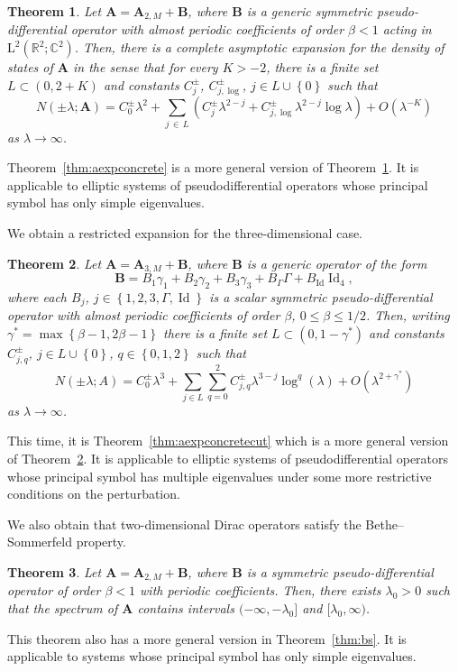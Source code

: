 \documentclass[10pt]{amsart}
\newtheorem{theo}{Theorem}[section]
\theoremstyle{definition}\newtheorem{defi}[theo]{Definition}\newtheorem{rema}[theo]{Remark}\newtheorem{exam}[theo]{Example}\newtheorem{nota}[theo]{Notation}
\DeclareMathOperator{\Id}{Id}
\newcommand{\RL}{\mathrm{L}}
\newcommand{\R}{\mathbb R}
\newcommand{\C}{\mathbb C}
\newcommand{\BA}{\mathbf A}
\newcommand{\BB}{\mathbf B}
\newcommand{\bigo}[1]{O\left(#1 \right)}
\newcommand{\set}[1]{\left\{ #1 \right\}}
\begin{document}
\begin{theo}\label{thm:dirac2dids}
Let $\BA = \BA_{2,M} + \BB$, where $\BB$ is a generic symmetric pseudo-differential operator with almost periodic coefficients of order $\beta < 1$ acting in $\RL^2(\R^2;\C^2)$. Then, there is a complete asymptotic expansion for the density of states of $\BA$ in the sense that for every $K > -2$, there is a finite set $L \subset (0,2+K)$ and constants $C_{j}^\pm$, $C_{j,\log}^\pm$, $j \in L \cup \set 0$ such that
\begin{equation}
N(\pm\lambda;\BA) = C_0^\pm \lambda^2 + \sum_{j\,\in\,L}\left(C_{j}^\pm
\lambda^{2 - j} + C_{j,\log}^\pm \lambda^{2-j} \log \lambda \right)+ \bigo{\lambda^{-K}}
\end{equation}
as $\lambda \to \infty$.
\end{theo}
Theorem~\ref{thm:aexpconcrete} is a more general version of Theorem~\ref{thm:dirac2dids}. It is applicable to elliptic systems of pseudodifferential operators whose principal symbol has only simple eigenvalues.

We obtain a restricted expansion for the three-dimensional case.
\begin{theo}\label{thm:dirac3dids}
Let $\BA = \BA_{3,M} + \BB$, where $\BB$ is a generic operator of the form
\[
\BB = B_1 \gamma_1 + B_2 \gamma_2 + B_3 \gamma_3 + B_\Gamma \Gamma + B_{\Id}
\Id_4,
\]
where each $B_j$, $j \in\set{1,2,3,\Gamma,\Id}$ is a scalar symmetric pseudo-differential operator with almost periodic coefficients of order $\beta$, $0 \le \beta \le 1/2$. Then, writing $\gamma^* = \max \set{\beta - 1, 2 \beta - 1}$ there is a finite set $L \subset (0,1 - \gamma^*)$ and constants $C_{j,q}^\pm$, $j \in L \cup \set{0}$, $q \in \set{0,1,2}$ such that
\begin{equation}
N(\pm\lambda;A) = C_0^\pm \lambda^3 + \sum_{j \in L} \sum_{q = 0}^2 C_{j,q}^\pm
\lambda^{3 - j} \log^q(\lambda) + \bigo{\lambda^{2 +
\gamma^*}}
\end{equation}
as $\lambda \to \infty$.
\end{theo}
This time, it is Theorem~\ref{thm:aexpconcretecut} which is a more general version of Theorem~\ref{thm:dirac3dids}. It is applicable to elliptic systems of pseudodifferential operators whose principal symbol has multiple eigenvalues under some more restrictive conditions on the perturbation.

We also obtain that two-dimensional Dirac operators satisfy the Bethe--Sommerfeld property.
\begin{theo}\label{thm:dirac2dbs}
Let $\BA = \BA_{2,M} + \BB$, where $\BB$ is a symmetric pseudo-differential operator of order $\beta < 1$ with periodic coefficients. Then, there exists $\lambda_0 > 0$ such that the spectrum of $\BA$ contains intervals $(-\infty,-\lambda_0]$ and $[\lambda_0,\infty)$.
\end{theo} 
This theorem also has a more general version in Theorem~\ref{thm:bs}. It is applicable to systems whose principal symbol has only simple eigenvalues.
\end{document}

